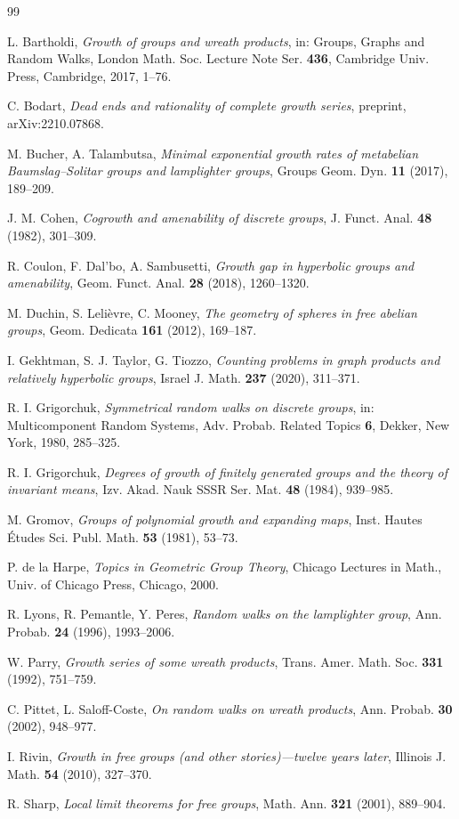 \documentclass[11pt]{amsart}
\theoremstyle{definition}
\theoremstyle{remark}
\begin{document}
\begin{thebibliography}{99}

L. Bartholdi,
\emph{Growth of groups and wreath products},
in: Groups, Graphs and Random Walks, London Math. Soc. Lecture Note Ser. \textbf{436}, Cambridge Univ. Press, Cambridge, 2017, 1--76.

C. Bodart,
\emph{Dead ends and rationality of complete growth series},
preprint, arXiv:2210.07868.

M. Bucher, A. Talambutsa,
\emph{Minimal exponential growth rates of metabelian Baumslag--Solitar groups and lamplighter groups},
Groups Geom. Dyn. \textbf{11} (2017), 189--209.

J. M. Cohen,
\emph{Cogrowth and amenability of discrete groups},
J. Funct. Anal. \textbf{48} (1982), 301--309.

R. Coulon, F. Dal'bo, A. Sambusetti,
\emph{Growth gap in hyperbolic groups and amenability},
Geom. Funct. Anal. \textbf{28} (2018), 1260--1320.

M. Duchin, S. Leli\`evre, C. Mooney,
\emph{The geometry of spheres in free abelian groups},
Geom. Dedicata \textbf{161} (2012), 169--187.

I. Gekhtman, S. J. Taylor, G. Tiozzo,
\emph{Counting problems in graph products and relatively hyperbolic groups},
Israel J. Math. \textbf{237} (2020), 311--371.

R. I. Grigorchuk,
\emph{Symmetrical random walks on discrete groups},
in: Multicomponent Random Systems, Adv. Probab. Related Topics \textbf{6}, Dekker, New York, 1980, 285--325.

R. I. Grigorchuk,
\emph{Degrees of growth of finitely generated groups and the theory of invariant means},
Izv. Akad. Nauk SSSR Ser. Mat. \textbf{48} (1984), 939--985.

M. Gromov,
\emph{Groups of polynomial growth and expanding maps},
Inst. Hautes \'Etudes Sci. Publ. Math. \textbf{53} (1981), 53--73.

P. de la Harpe,
\emph{Topics in Geometric Group Theory},
Chicago Lectures in Math., Univ. of Chicago Press, Chicago, 2000.

R. Lyons, R. Pemantle, Y. Peres,
\emph{Random walks on the lamplighter group},
Ann. Probab. \textbf{24} (1996), 1993--2006.

W. Parry,
\emph{Growth series of some wreath products},
Trans. Amer. Math. Soc. \textbf{331} (1992), 751--759.

C. Pittet, L. Saloff-Coste,
\emph{On random walks on wreath products},
Ann. Probab. \textbf{30} (2002), 948--977.

I. Rivin,
\emph{Growth in free groups (and other stories)---twelve years later},
Illinois J. Math. \textbf{54} (2010), 327--370.

R. Sharp,
\emph{Local limit theorems for free groups},
Math. Ann. \textbf{321} (2001), 889--904.

\end{thebibliography}
\end{document}
